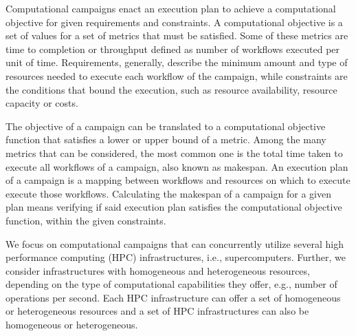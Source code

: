 \label{ch:campaigns}

Computational campaigns enact an execution plan to achieve a computational
objective for given requirements and constraints. A computational objective is a
set of values for a set of metrics that must be satisfied. Some of these metrics
are time to completion or throughput defined as number of workflows executed per
unit of time. Requirements, generally, describe the minimum amount and type of
resources needed to execute each workflow of the campaign, while constraints are
the conditions that bound the execution, such as resource availability, resource
capacity or costs.

The objective of a campaign can be translated to a computational objective
function that satisfies a lower or upper bound of a metric. Among the many
metrics that can be considered, the most common one is the total time taken to
execute all workflows of a campaign, also known as makespan. An execution plan
of a campaign is a mapping between workflows and resources on which to execute
execute those workflows. Calculating the makespan of a campaign for a given plan
means verifying if said execution plan satisfies the computational objective
function, within the given constraints.


We focus on computational campaigns that can concurrently utilize several high
performance computing (HPC) infrastructures, i.e., supercomputers. Further, we
consider infrastructures with homogeneous and heterogeneous resources, depending
on the type of computational capabilities they offer, e.g., number of operations
per second. Each HPC infrastructure can offer a set of homogeneous or
heterogeneous resources and a set of HPC infrastructures can also be homogeneous
or heterogeneous. 

